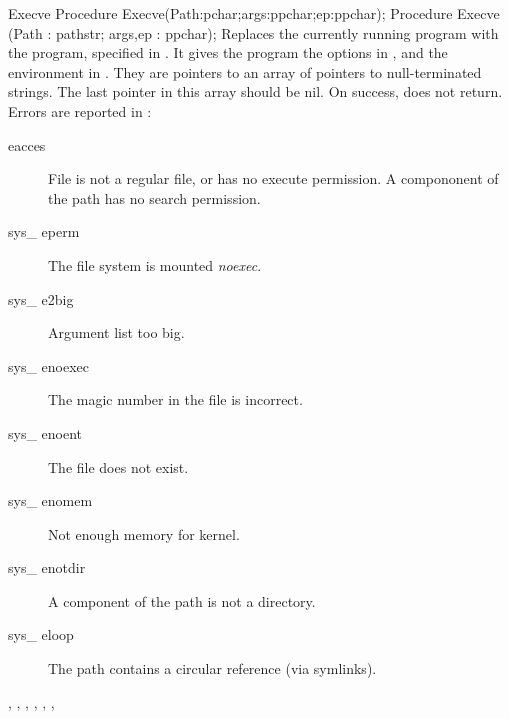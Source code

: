 \begin{procedure}{Execve}
\Declaration
Procedure Execve(Path:pchar;args:ppchar;ep:ppchar);
Procedure Execve (Path : pathstr; args,ep : ppchar);
\Description
Replaces the currently running program with the program, specified in
.
It gives the program the options in , and the environment in
. They are pointers to an array of pointers to null-terminated
strings. The last pointer in this array should be nil.
On success,  does not return.
\Errors
Errors are reported in :
\begin{description}
\item[eacces] File is not a regular file, or has no execute permission.
A compononent of the path has no search permission.
\item[sys\_ eperm] The file system is mounted \textit{noexec}.
\item[sys\_ e2big] Argument list too big.
\item[sys\_ enoexec] The magic number in the file is incorrect.
\item[sys\_ enoent] The file does not exist.
\item[sys\_ enomem] Not enough memory for kernel.
\item[sys\_ enotdir] A component of the path is not a directory.
\item[sys\_ eloop] The path contains a circular reference (via symlinks).
\end{description}
\SeeAlso
{}, ,  ,
, , ,  
\end{procedure}



